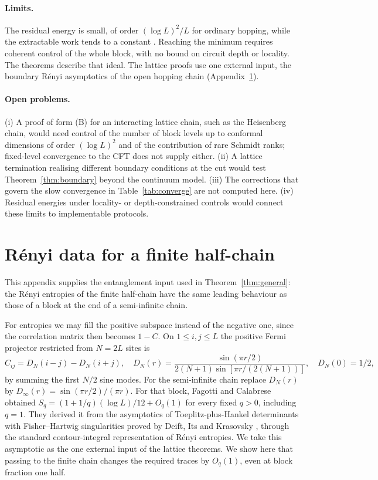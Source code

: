 \documentclass[11pt,a4paper]{article}
\theoremstyle{remark}
\begin{document}
\paragraph{Limits.} The residual energy is small, of order $(\log L)^2/L$ for ordinary hopping, while the extractable work tends to a constant \cite{mula}. Reaching the minimum requires coherent control of the whole block, with no bound on circuit depth or locality. The theorems describe that ideal. The lattice proofs use one external input, the boundary R\'enyi asymptotics of the open hopping chain (Appendix~\ref{app:renyi}).

\paragraph{Open problems.} (i) A proof of form (B) for an interacting lattice chain, such as the Heisenberg chain, would need control of the number of block levels up to conformal dimensions of order $(\log L)^2$ and of the contribution of rare Schmidt ranks; fixed-level convergence to the CFT does not supply either. (ii) A lattice termination realising different boundary conditions at the cut would test Theorem~\ref{thm:boundary} beyond the continuum model. (iii) The corrections that govern the slow convergence in Table~\ref{tab:converge} are not computed here. (iv) Residual energies under locality- or depth-constrained controls would connect these limits to implementable protocols.

\appendix
\section{R\'enyi data for a finite half-chain}\label{app:renyi}
This appendix supplies the entanglement input used in Theorem~\ref{thm:general}: the R\'enyi entropies of the finite half-chain have the same leading behaviour as those of a block at the end of a semi-infinite chain.

For entropies we may fill the positive subspace instead of the negative one, since the correlation matrix then becomes $1-C$. On $1\le i,j\le L$ the positive Fermi projector restricted from $N=2L$ sites is
\[
 C_{ij}=D_N(i-j)-D_N(i+j),\quad
 D_N(r)=\frac{\sin(\pi r/2)}{2(N+1)\sin[\pi r/(2(N+1))]},\quad D_N(0)=1/2 ,
\]
by summing the first $N/2$ sine modes. For the semi-infinite chain replace $D_N(r)$ by $D_\infty(r)=\sin(\pi r/2)/(\pi r)$. For that block, Fagotti and Calabrese \cite[Eq.~(38)]{fagotti} obtained $S_q=(1+1/q)(\log L)/12+O_q(1)$ for every fixed $q>0$, including $q=1$. They derived it from the asymptotics of Toeplitz-plus-Hankel determinants with Fisher--Hartwig singularities proved by Deift, Its and Krasovsky \cite{dik}, through the standard contour-integral representation of R\'enyi entropies. We take this asymptotic as the one external input of the lattice theorems. We show here that passing to the finite chain changes the required traces by $O_q(1)$, even at block fraction one half.
\end{document}
